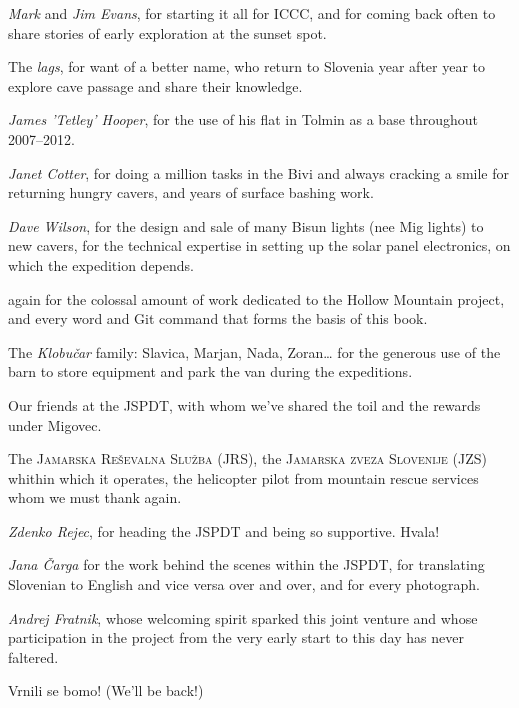 \begin{citemize}
\item \textit{Mark} and \textit{Jim Evans}, for starting it all for ICCC, and for coming back often to share stories of early exploration at the sunset spot.
\item The \textit{lags}, for want of a better name, who return to Slovenia year after year to explore cave passage and share their knowledge.
\item \textit{James 'Tetley' Hooper}, for the use of his flat in Tolmin as a base throughout 2007--2012.
\item \textit{Janet Cotter}, for doing a million tasks in the Bivi and always cracking a smile for returning hungry cavers, and years of surface bashing work. 
\item \textit{Dave Wilson}, for the design and sale of many Bisun lights (nee Mig lights) to new cavers, for the technical expertise in setting up the solar panel electronics, on which the expedition depends.


\item {} again for the colossal amount of work dedicated to the Hollow Mountain project, and every word and Git command that forms the basis of this book. 


\item The \textit{Klobu\v{c}ar} family: Slavica, Marjan, Nada, Zoran\ldots{} for the generous use of the barn to store equipment and park the van during the expeditions.

\item Our friends at the JSPDT, with whom we've shared the toil and the rewards under Migovec.
\item The \textsc{Jamarska Re\v{s}evalna Slu\v{z}ba} (JRS), the \textsc{Jamarska zveza Slovenije} (JZS) whithin which it operates, the helicopter pilot from mountain rescue services whom we must thank again.
\item \textit{Zdenko Rejec}, for heading the JSPDT and being so supportive. Hvala!
\item \textit{Jana \v{C}arga} for the work behind the scenes within the JSPDT, for translating Slovenian to English and vice versa over and over, and for every photograph.
\item \textit{Andrej Fratnik}, whose welcoming spirit sparked this joint venture and whose participation in the project from the very early start to this day has never faltered. 
\end{citemize}


Vrnili se bomo! (We'll be back!)